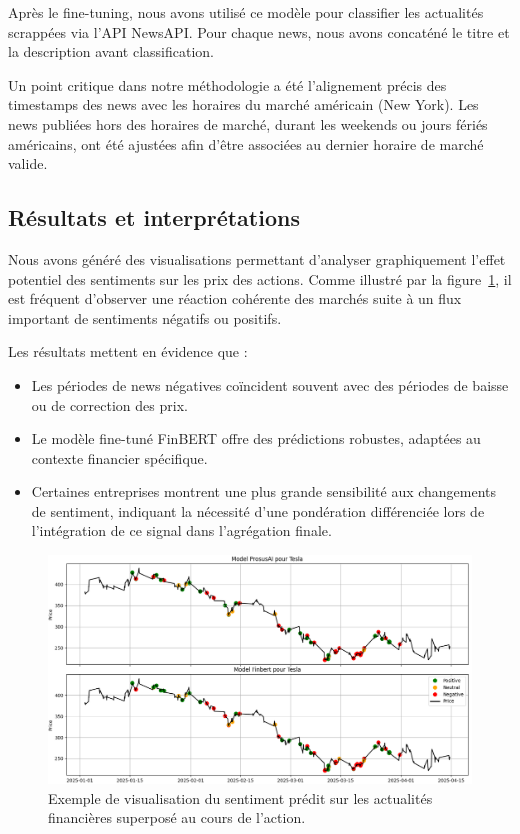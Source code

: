 \documentclass[a4paper,12pt]{article}
\begin{document}
Après le fine-tuning, nous avons utilisé ce modèle pour classifier les actualités scrappées via l'API NewsAPI. Pour chaque news, nous avons concaténé le titre et la description avant classification.

Un point critique dans notre méthodologie a été l'alignement précis des timestamps des news avec les horaires du marché américain (New York). Les news publiées hors des horaires de marché, durant les weekends ou jours fériés américains, ont été ajustées afin d'être associées au dernier horaire de marché valide.

\subsection*{Résultats et interprétations}

Nous avons généré des visualisations permettant d'analyser graphiquement l'effet potentiel des sentiments sur les prix des actions. Comme illustré par la figure~\ref{fig:sentiments}, il est fréquent d'observer une réaction cohérente des marchés suite à un flux important de sentiments négatifs ou positifs.

Les résultats mettent en évidence que :
\begin{itemize}
    \item Les périodes de news négatives coïncident souvent avec des périodes de baisse ou de correction des prix.
    \item Le modèle fine-tuné FinBERT offre des prédictions robustes, adaptées au contexte financier spécifique.
    \item Certaines entreprises montrent une plus grande sensibilité aux changements de sentiment, indiquant la nécessité d'une pondération différenciée lors de l'intégration de ce signal dans l'agrégation finale.
\end{itemize}

\begin{figure}[h!]
    \centering
    \includegraphics[width=\textwidth]{Model Comparison.png}
    \caption{Exemple de visualisation du sentiment prédit sur les actualités financières superposé au cours de l'action.}
    \label{fig:sentiments}
\end{figure}
\end{document}
